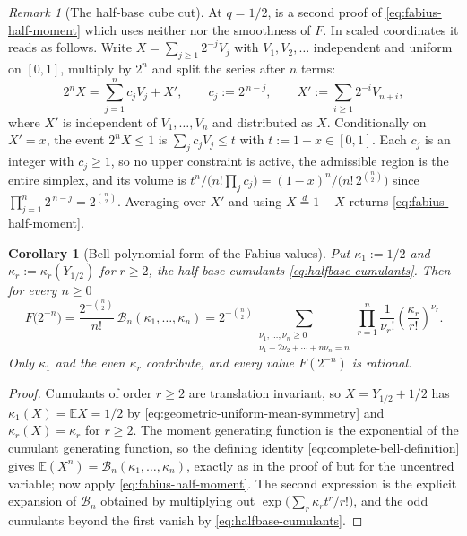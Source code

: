 \documentclass[11pt,oneside,openany]{book}
\newtheorem{corollary}[corollary]{Corollary}
\theoremstyle{definition}
\theoremstyle{remark}
\newtheorem{remark}[remark]{Remark}
\newcommand{\defeq}{\mathrel{:=}}
\begin{document}
\begin{remark}[The half-base cube cut]\label{rem:half-moment-cube-cut}
At $q=1/2$,  is a second proof of
\eqref{eq:fabius-half-moment} which uses neither  nor the smoothness
of $F$.  In scaled coordinates it reads as follows.  Write $X=\sum_{j\ge1}2^{-j}V_j$ with
$V_1,V_2,\ldots$ independent and uniform on $[0,1]$, multiply by $2^n$ and split the
series after $n$ terms:
\begin{equation}\label{eq:fabius-scaled-split}
 2^nX=\sum_{j=1}^{n}c_jV_j+X',
 \qquad c_j\defeq2^{\,n-j},
 \qquad X'\defeq\sum_{i\ge1}2^{-i}V_{n+i},
\end{equation}
where $X'$ is independent of $V_1,\ldots,V_n$ and distributed as $X$.  Conditionally on
$X'=x$, the event $2^nX\le1$ is $\sum_jc_jV_j\le t$ with $t\defeq1-x\in[0,1]$.  Each $c_j$
is an integer with $c_j\ge1$, so no upper constraint is active, the admissible region is
the entire simplex, and its volume is
$t^n/\bigl(n!\prod_jc_j\bigr)=(1-x)^n/\bigl(n!\,2^{\binom n2}\bigr)$ since
$\prod_{j=1}^{n}2^{\,n-j}=2^{\binom n2}$.  Averaging over $X'$ and using
$X\overset d=1-X$ returns \eqref{eq:fabius-half-moment}.
\end{remark}

\begin{corollary}[Bell-polynomial form of the Fabius values]\label{cor:fabius-bell-values}
Put $\kappa_1\defeq1/2$ and $\kappa_r\defeq\kappa_r(Y_{1/2})$ for $r\ge2$, the half-base
cumulants \eqref{eq:halfbase-cumulants}.  Then for every $n\ge0$
\begin{equation}\label{eq:fabius-bell-value}
 F\bigl(2^{-n}\bigr)
 =\frac{2^{-\binom n2}}{n!}\,\mathcal B_n(\kappa_1,\ldots,\kappa_n)
 =2^{-\binom n2}
 \sum_{\substack{\nu_1,\ldots,\nu_n\ge0\\ \nu_1+2\nu_2+\cdots+n\nu_n=n}}
 \prod_{r=1}^{n}\frac1{\nu_r!}\left(\frac{\kappa_r}{r!}\right)^{\nu_r}.
\end{equation}
Only $\kappa_1$ and the even $\kappa_r$ contribute, and every value $F(2^{-n})$ is
rational.
\end{corollary}

\begin{proof}
Cumulants of order $r\ge2$ are translation invariant, so $X=Y_{1/2}+1/2$ has
$\kappa_1(X)=\mathbb EX=1/2$ by \eqref{eq:geometric-uniform-mean-symmetry} and
$\kappa_r(X)=\kappa_r$ for $r\ge2$.  The moment generating function is the exponential of
the cumulant generating function, so the defining identity
\eqref{eq:complete-bell-definition} gives
$\mathbb E(X^n)=\mathcal B_n(\kappa_1,\ldots,\kappa_n)$, exactly as in the proof of
 but for the uncentred variable; now apply
\eqref{eq:fabius-half-moment}.  The second expression is the explicit expansion of
$\mathcal B_n$ obtained by multiplying out $\exp\bigl(\sum_r\kappa_rt^r/r!\bigr)$, and the
odd cumulants beyond the first vanish by \eqref{eq:halfbase-cumulants}.
\end{proof}
\end{document}
